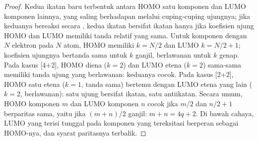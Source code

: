 \begin{proof}
Kedua ikatan baru terbentuk antara HOMO satu komponen dan LUMO komponen
lainnya, yang saling berhadapan melalui cuping-cuping ujungnya; jika keduanya bereaksi
secara , kedua ikatan bersifat ikatan hanya jika koefisien ujung
HOMO dan LUMO memiliki tanda relatif yang sama. Untuk komponen dengan $N$
elektron pada $N$ atom, HOMO memiliki $k = N/2$ dan LUMO $k = N/2 + 1$; koefisien ujungnya
bertanda sama untuk $k$ ganjil, berlawanan untuk $k$ genap. Pada kasus [4+2], HOMO diena ($k = 2$)
dan LUMO etena ($k = 2$) sama-sama memiliki tanda ujung yang berlawanan: keduanya cocok. Pada
kasus [2+2], HOMO satu etena ($k = 1$, tanda sama) bertemu dengan LUMO etena yang lain
($k = 2$, berlawanan): satu ujung bersifat ikatan, satu antiikatan. Secara umum, HOMO komponen $m$
dan LUMO komponen $n$ cocok jika $m/2$ dan $n/2 + 1$ berparitas
sama, yaitu jika $(m + n)/2$ ganjil: $m + n = 4q + 2$. Di bawah cahaya, LUMO yang terisi tunggal pada
komponen yang tereksitasi berperan sebagai HOMO-nya, dan syarat paritasnya
terbalik.
\end{proof}

